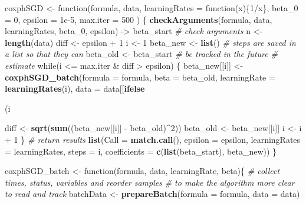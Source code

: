 \documentclass[]{article}
\newenvironment{Shaded}{\begin{snugshade}}{\end{snugshade}}
\newcommand{\KeywordTok}[1]{\textcolor[rgb]{0.13,0.29,0.53}{\textbf{{#1}}}}
\newcommand{\DataTypeTok}[1]{\textcolor[rgb]{0.13,0.29,0.53}{{#1}}}
\newcommand{\DecValTok}[1]{\textcolor[rgb]{0.00,0.00,0.81}{{#1}}}
\newcommand{\FloatTok}[1]{\textcolor[rgb]{0.00,0.00,0.81}{{#1}}}
\newcommand{\StringTok}[1]{\textcolor[rgb]{0.31,0.60,0.02}{{#1}}}
\newcommand{\CommentTok}[1]{\textcolor[rgb]{0.56,0.35,0.01}{\textit{{#1}}}}
\newcommand{\NormalTok}[1]{{#1}}
\begin{document}
\begin{Shaded}
\begin{Highlighting}[]
\NormalTok{coxphSGD <-}\StringTok{ }\NormalTok{function(formula, data, }\DataTypeTok{learningRates =} \NormalTok{function(x)\{}\DecValTok{1}\NormalTok{/x\},}
                    \DataTypeTok{beta_0 =} \DecValTok{0}\NormalTok{, }\DataTypeTok{epsilon =} \FloatTok{1e-5}\NormalTok{, }\DataTypeTok{max.iter =} \DecValTok{500} \NormalTok{) \{}
  \KeywordTok{checkArguments}\NormalTok{(formula, data, learningRates,}
                  \NormalTok{beta_0, epsilon) ->}\StringTok{ }\NormalTok{beta_start }\CommentTok{# check arguments}
  \NormalTok{n <-}\StringTok{ }\KeywordTok{length}\NormalTok{(data)}
  \NormalTok{diff <-}\StringTok{ }\NormalTok{epsilon +}\StringTok{ }\DecValTok{1}
  \NormalTok{i <-}\StringTok{ }\DecValTok{1}
  \NormalTok{beta_new <-}\StringTok{ }\KeywordTok{list}\NormalTok{()     }\CommentTok{# steps are saved in a list so that they can}
  \NormalTok{beta_old <-}\StringTok{ }\NormalTok{beta_start }\CommentTok{# be tracked in the future}
  \CommentTok{# estimate}
  \NormalTok{while(i <=}\StringTok{ }\NormalTok{max.iter &}\StringTok{ }\NormalTok{diff >}\StringTok{ }\NormalTok{epsilon) \{}
    \NormalTok{beta_new[[i]] <-}\StringTok{ }\KeywordTok{coxphSGD_batch}\NormalTok{(}\DataTypeTok{formula =} \NormalTok{formula, }\DataTypeTok{beta =} \NormalTok{beta_old,}
        \DataTypeTok{learningRate =} \KeywordTok{learningRates}\NormalTok{(i), }\DataTypeTok{data =} \NormalTok{data[[}\KeywordTok{ifelse}\NormalTok{(i%%n==}\DecValTok{0}\NormalTok{,n,i%%n)]])}
    
    \NormalTok{diff <-}\StringTok{ }\KeywordTok{sqrt}\NormalTok{(}\KeywordTok{sum}\NormalTok{((beta_new[[i]] -}\StringTok{ }\NormalTok{beta_old)^}\DecValTok{2}\NormalTok{))}
    \NormalTok{beta_old <-}\StringTok{ }\NormalTok{beta_new[[i]]}
    \NormalTok{i <-}\StringTok{ }\NormalTok{i +}\StringTok{ }\DecValTok{1}  
  \NormalTok{\}}
  \CommentTok{# return results}
  \KeywordTok{list}\NormalTok{(}\DataTypeTok{Call =} \KeywordTok{match.call}\NormalTok{(), }\DataTypeTok{epsilon =} \NormalTok{epsilon, }\DataTypeTok{learningRates =} \NormalTok{learningRates,}
       \DataTypeTok{steps =} \NormalTok{i, }\DataTypeTok{coefficients =} \KeywordTok{c}\NormalTok{(}\KeywordTok{list}\NormalTok{(beta_start), beta_new))}
\NormalTok{\}}

\NormalTok{coxphSGD_batch <-}\StringTok{ }\NormalTok{function(formula, data, learningRate, beta)\{}
  \CommentTok{# collect times, status, variables and reorder samples }
  \CommentTok{# to make the algorithm more clear to read and track}
  \NormalTok{batchData <-}\StringTok{ }\KeywordTok{prepareBatch}\NormalTok{(}\DataTypeTok{formula =} \NormalTok{formula, }\DataTypeTok{data =} \NormalTok{data)}
  
}
\end{Highlighting}
\end{Shaded}
\end{document}
